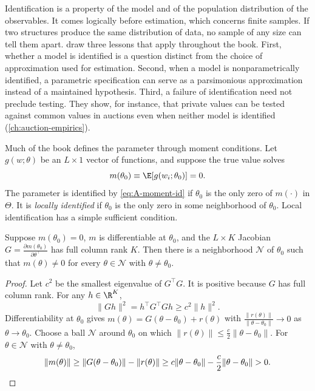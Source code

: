 Identification is a property of the model and of the population distribution of the observables. It comes
logically before estimation, which concerns finite samples. If two structures produce the same distribution
of data, no sample of any size can tell them apart. \citet[pp.~2108--2109]{AtheyHaile2002} draw three
lessons that apply throughout the book. First, whether a model is identified is a question distinct from
the choice of approximation used for estimation. Second, when a model is nonparametrically identified, a
parametric specification can serve as a parsimonious approximation instead of a maintained hypothesis.
Third, a failure of identification need not preclude testing. They show, for instance, that private values
can be tested against common values in auctions even when neither model is identified
(\cref{ch:auction-empirics}).

Much of the book defines the parameter through moment conditions. Let $g(w; \theta)$ be an $L \times 1$
vector of functions, and suppose the true value solves
\begin{equation}\label{eq:A-moment-id}
m(\theta_0) \equiv \E[g(w_i; \theta_0)] = 0 .
\end{equation}
The parameter is identified by \eqref{eq:A-moment-id} if $\theta_0$ is the only zero of $m(\cdot)$ in
$\Theta$. It is \emph{locally identified} if $\theta_0$ is the only zero in some neighborhood of $\theta_0$.
Local identification has a simple sufficient condition.

\begin{proposition}\label{prop:A-local-id}
Suppose $m(\theta_0) = 0$, $m$ is differentiable at $\theta_0$, and the $L \times K$ Jacobian
$G = \frac{\partial m(\theta_0)}{\partial\theta^\top}$ has full column rank $K$. Then there is a neighborhood
$\mathcal{N}$ of $\theta_0$ such that $m(\theta) \neq 0$ for every $\theta \in \mathcal{N}$ with
$\theta \neq \theta_0$.
\end{proposition}

\begin{proof}
Let $c^2$ be the smallest eigenvalue of $G^\top G$. It is positive because $G$ has full column rank. For any
$h \in \R^K$,
\begin{equation*}
\lVert Gh\rVert^2 = h^\top G^\top G h \ge c^2\lVert h\rVert^2 .
\end{equation*}
Differentiability at $\theta_0$ gives $m(\theta) = G(\theta - \theta_0) + r(\theta)$ with
$\frac{\lVert r(\theta)\rVert}{\lVert\theta - \theta_0\rVert} \to 0$ as $\theta \to \theta_0$. Choose a ball
$\mathcal{N}$ around $\theta_0$ on which $\lVert r(\theta)\rVert \le \frac{c}{2}\lVert\theta - \theta_0\rVert$.
For $\theta \in \mathcal{N}$ with $\theta \neq \theta_0$,
\begin{equation*}
\lVert m(\theta)\rVert \ge \lVert G(\theta - \theta_0)\rVert - \lVert r(\theta)\rVert
\ge c\lVert\theta - \theta_0\rVert - \frac{c}{2}\lVert\theta - \theta_0\rVert > 0 .
\qedhere
\end{equation*}
\end{proof}

